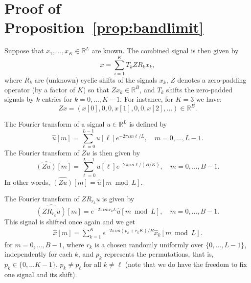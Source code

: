 \documentclass[english,12pt]{article}
\newcommand{\I}{\iota}
\newcommand{\R}{\mathbb{R}}
\numberwithin{equation}{section}
\numberwithin{thm}{section} %
\begin{document}
	




\appendix

\section{Proof of Proposition~\ref{prop:bandlimit}} \label{sec:proof_bandlimit}
Suppose that $x_1,\ldots,x_K\in\R^L$ are known.
The combined signal is then given by 
\begin{equation}
x = \sum_{i=1}^K T_kZR_kx_k,
\end{equation}
where $R_k$ are (unknown) cyclic shifts of the signals $x_k$, $Z$ denotes a zero-padding operator (by a factor of $K$) so that $Zx_k\in\mathbb{R}^B$, and $T_k$ shifts the zero-padded signals by $k$ entries for $k=0,\ldots, K-1$. 
For instance, for $K=3$ we have: 
\begin{equation}
Zx = (x[0],0,0,x[1],0,0,x[2],...)\in\mathbb{R}^B.
\end{equation}

The Fourier transform of a signal $u\in\mathbb{R}^{L}$ is defined by 
\begin{equation}
\hat{u}[m]=\sum_{\ell=0}^{L-1}u[\ell]e^{-2\pi\I m\ell /L}, \quad m=0,\ldots,L-1. 
\end{equation}
The Fourier transform of $Zu$ is then given by 
\begin{equation}
\widehat{(Zu)}[m] = \sum_{\ell=0}^{L-1}u[\ell]e^{-2\pi\I m\ell /(B/K)}, \quad m=0,\ldots,B-1.
\end{equation}
In other words, $\widehat{(Zu)}[m] = \hat{u}[m\bmod L]$.


The Fourier transform of $ZR_{r_k}u$ is  given by 
\begin{equation}
\widehat{(ZR_{r_k}u)}[m] = e^{-2\pi\I m r_k L} \hat{u}[m\bmod L], \quad m=0,\ldots,B-1.
\end{equation}
This signal is shifted once again and we get
\begin{eqnarray} \label{eq:Fourier_structure}
\hat{x}[m] = \sum_{k=1}^K e^{-2\pi\I m( p_k+r_k K)/B} \hat{x}_k[m \bmod L]. 
\end{eqnarray}
for $m=0,\ldots,B-1$, 
where $r_k$ is a chosen randomly uniformly over $\{0,\ldots,L-1\}$, independently for each $k$, and $p_k$ represents the permutations, that is, $p_k\in\{0,\ldots K-1\}$, $p_k\neq p_\ell$ for all $k\neq \ell$ (note that we do have the freedom to fix one signal and its shift). 
\end{document}
